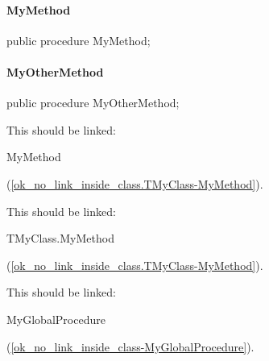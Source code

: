 \documentclass{report}
\newif\ifpdf
\begin{document}
\paragraph*{MyMethod}\hspace*{\fill}

\label{ok_no_link_inside_class.TMyClass-MyMethod}
\begin{list}{}{
\setlength{\itemindent}{0cm}
\setlength{\listparindent}{0cm}
\setlength{\leftmargin}{\evensidemargin}
\addtolength{\leftmargin}{\tmplength}
\settowidth{\labelsep}{X}
\addtolength{\leftmargin}{\labelsep}
\setlength{\labelwidth}{\tmplength}
}
\item[\textbf{Declaration}\hfill]
\ifpdf
\begin{flushleft}
\fi
\begin{ttfamily}
public procedure MyMethod;\end{ttfamily}

\ifpdf
\end{flushleft}
\fi

\end{list}
\paragraph*{MyOtherMethod}\hspace*{\fill}

\label{ok_no_link_inside_class.TMyClass-MyOtherMethod}
\begin{list}{}{
\setlength{\itemindent}{0cm}
\setlength{\listparindent}{0cm}
\setlength{\leftmargin}{\evensidemargin}
\addtolength{\leftmargin}{\tmplength}
\settowidth{\labelsep}{X}
\addtolength{\leftmargin}{\labelsep}
\setlength{\labelwidth}{\tmplength}
}
\item[\textbf{Declaration}\hfill]
\ifpdf
\begin{flushleft}
\fi
\begin{ttfamily}
public procedure MyOtherMethod;\end{ttfamily}

\ifpdf
\end{flushleft}
\fi

\par
\item[\textbf{Description}]
This should be linked: \begin{ttfamily}MyMethod\end{ttfamily}(\ref{ok_no_link_inside_class.TMyClass-MyMethod}).

This should be linked: \begin{ttfamily}TMyClass.MyMethod\end{ttfamily}(\ref{ok_no_link_inside_class.TMyClass-MyMethod}).

This should be linked: \begin{ttfamily}MyGlobalProcedure\end{ttfamily}(\ref{ok_no_link_inside_class-MyGlobalProcedure}).

\end{list}
\end{document}

